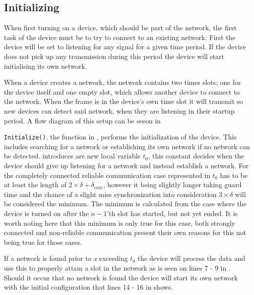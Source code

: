 \subsection{Initializing} %
\label{sub:setupCCRC} 
When first turning on a device, which should be part of the network, the first task of the device must be to try to connect to an existing network.
First the device will be set to listening for any signal for a given time period. 
If the device does not pick up any transmission during this period the device will start initialising its own network.

When a device creates a network, the network contains two times slots; one for the device itself and one empty slot, which allows another device to connect to the network.
When the frame is in the device's own time slot it will transmit so new devices can detect said network, when they are listening in their startup period.  
A flow diagram of this setup can be seeon in 

 
\bigskip \noindent
\texttt{Initialize()}, the function in , performs the initialization of the device.
This includes searching for a network or establishing its own network if no network can be detected.
 introduces are new local variable $t_0$, this constant decides when the device should give up listening for a network and instead establish a network.
For the completely connected reliable communication case represented in  $t_0$ has to be at least the length of $2 \times \delta + \delta_{com}$, however it being slightly longer taking guard time and the chance of a slight miss synchronization into consideration $3 \times \delta$ will be considered the minimum.
The minimum is calculated from the case where the device is turned on after the $n-1$'th slot has started, but not yet ended.
It is worth noting here that this minimum is only true for this case, both strongly connected and non-reliable communication present their own reasons for this not being true for those cases.

If a network is found prior to \textit{x} exceeding $t_0$ the device will process the data and use this to properly attain a slot in the network as is seen on lines 7 - 9 in .
Should it occur that no network is found the device will start its own network with the initial configuration that lines 14 - 16 in  shows.

